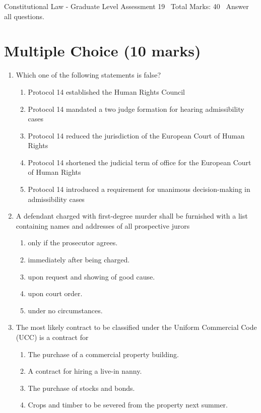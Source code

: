 \documentclass[12pt]{article}
\begin{document}
\begin{center}
Constitutional Law - Graduate Level Assessment 19 \
Total Marks: 40 \
Answer all questions.
\end{center}

\section*{Multiple Choice (10 marks)}
\begin{enumerate}[label=\arabic*.]
\item Which one of the following statements is false?
\begin{enumerate}[label=(\alph*)]
    \item Protocol 14 established the Human Rights Council
    \item Protocol 14 mandated a two judge formation for hearing admissibility cases
    \item Protocol 14 reduced the jurisdiction of the European Court of Human Rights
    \item Protocol 14 shortened the judicial term of office for the European Court of Human Rights
    \item Protocol 14 introduced a requirement for unanimous decision-making in admissibility cases
\end{enumerate}
\item A defendant charged with first-degree murder shall be furnished with a list containing names and addresses of all prospective jurors
\begin{enumerate}[label=(\alph*)]
    \item only if the prosecutor agrees.
    \item immediately after being charged.
    \item upon request and showing of good cause.
    \item upon court order.
    \item under no circumstances.
\end{enumerate}
\item The most likely contract to be classified under the Uniform Commercial Code (UCC) is a contract for
\begin{enumerate}[label=(\alph*)]
    \item The purchase of a commercial property building.
    \item A contract for hiring a live-in nanny.
    \item The purchase of stocks and bonds.
    \item Crops and timber to be severed from the property next summer.

\end{enumerate}
\end{enumerate}
\end{document}
